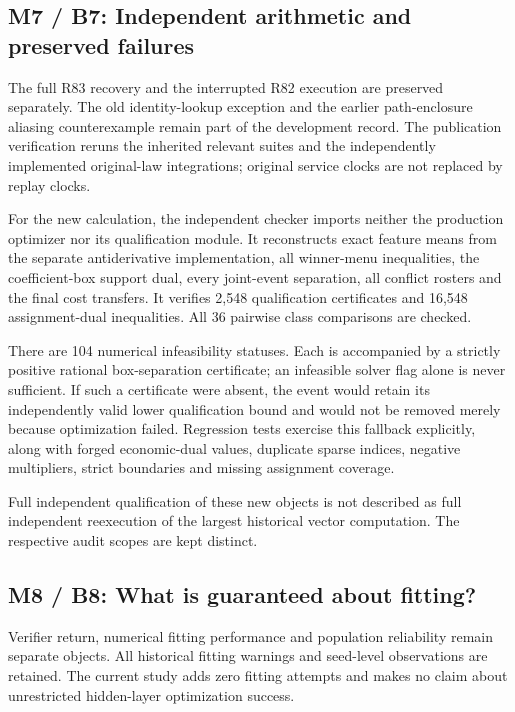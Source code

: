 \documentclass[ecta,nameyear,draft]{econsocart}
\begin{document}
\hypertarget{m7-b7-independent-arithmetic-and-preserved-failures}{%
\subsection{M7 / B7: Independent arithmetic and preserved
failures}\label{m7-b7-independent-arithmetic-and-preserved-failures}}

The full R83 recovery and the interrupted R82 execution are preserved
separately. The old identity-lookup exception and the earlier
path-enclosure aliasing counterexample remain part of the development
record. The publication verification reruns the inherited relevant
suites and the independently implemented original-law integrations;
original service clocks are not replaced by replay clocks.

For the new calculation, the independent checker imports neither the
production optimizer nor its qualification module. It reconstructs exact
feature means from the separate antiderivative implementation, all
winner-menu inequalities, the coefficient-box support dual, every
joint-event separation, all conflict rosters and the final cost
transfers. It verifies 2,548 qualification certificates and 16,548
assignment-dual inequalities. All 36 pairwise class comparisons are
checked.

There are 104 numerical infeasibility statuses. Each is accompanied by a
strictly positive rational box-separation certificate; an infeasible
solver flag alone is never sufficient. If such a certificate were
absent, the event would retain its independently valid lower
qualification bound and would not be removed merely because optimization
failed. Regression tests exercise this fallback explicitly, along with
forged economic-dual values, duplicate sparse indices, negative
multipliers, strict boundaries and missing assignment coverage.

Full independent qualification of these new objects is not described as
full independent reexecution of the largest historical vector
computation. The respective audit scopes are kept distinct.

\hypertarget{m8-b8-what-is-guaranteed-about-fitting}{%
\subsection{M8 / B8: What is guaranteed about
fitting?}\label{m8-b8-what-is-guaranteed-about-fitting}}

Verifier return, numerical fitting performance and population
reliability remain separate objects. All historical fitting warnings and
seed-level observations are retained. The current study adds zero
fitting attempts and makes no claim about unrestricted hidden-layer
optimization success.
\end{document}
